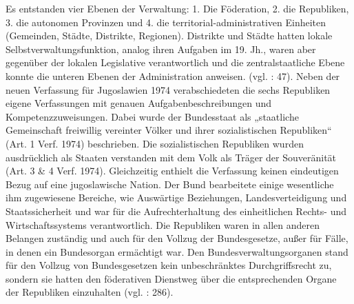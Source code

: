 Es entstanden vier Ebenen der Verwaltung: 1. Die Föderation, 2. die Republiken, 3. die autonomen Provinzen und 4. die territorial-administrativen Einheiten (Gemeinden, Städte, Distrikte, Regionen). Distrikte und Städte hatten lokale Selbstverwaltungsfunktion, analog ihren Aufgaben im 19. Jh., waren aber gegenüber der lokalen Legislative verantwortlich und die zentralstaatliche Ebene konnte die unteren Ebenen der Administration anweisen. (vgl. \cite{sevic} : 47). Neben der neuen Verfassung für Jugoslawien 1974 verabschiedeten die sechs Republiken eigene Verfassungen mit genauen Aufgabenbeschreibungen und Kompetenzzuweisungen. Dabei wurde der Bundesstaat als „staatliche Gemeinschaft freiwillig vereinter Völker und ihrer sozialistischen Republiken“ (Art. 1 Verf. 1974) beschrieben. Die sozialistischen Republiken wurden ausdrücklich als Staaten verstanden mit dem Volk als Träger der Souveränität (Art. 3 \& 4 Verf. 1974). Gleichzeitig enthielt die Verfassung keinen eindeutigen Bezug auf eine jugoslawische Nation. Der Bund bearbeitete einige wesentliche ihm zugewiesene Bereiche, wie Auswärtige Beziehungen, Landesverteidigung und Staatssicherheit und war für die Aufrechterhaltung des einheitlichen Rechts- und Wirtschaftssystems verantwortlich. Die Republiken waren in allen anderen Belangen zuständig und auch für den Vollzug der Bundesgesetze, außer für Fälle, in denen ein Bundesorgan ermächtigt war. Den Bundesverwaltungsorganen stand für den Vollzug von Bundesgesetzen kein unbeschränktes Durchgriffsrecht zu, sondern sie hatten den föderativen Dienstweg über die entsprechenden Organe der Republiken einzuhalten (vgl. \cite{roggemann} : 286).\par
